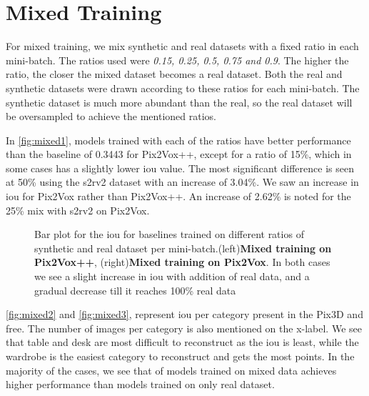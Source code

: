 \section{Mixed Training}\label{sec:mixed-training}
For mixed training, we mix synthetic and real datasets with a fixed ratio in each mini-batch.
The ratios used were \emph{0.15, 0.25, 0.5, 0.75 and 0.9}.
The higher the ratio, the closer the mixed dataset becomes a real dataset.
Both the real and synthetic datasets were drawn according to these ratios for each mini-batch.
The synthetic dataset is much more abundant than the real, so the real dataset will be oversampled to achieve the mentioned ratios.

In \autoref{fig:mixed1}, models trained with each of the ratios have better performance than the baseline of 0.3443 for Pix2Vox++,
except for a ratio of 15\%, which in some cases has a slightly lower \gls{iou}  value.
The most significant difference is seen at 50\% using the \gls{s2rv2} dataset with an increase of 3.04\%.
We saw an increase in \gls{iou} for Pix2Vox rather than Pix2Vox++.
An increase of 2.62\% is noted for the 25\% mix with \gls{s2rv2} on Pix2Vox.

\begin{figure}[ht]
    \centering
    \resizebox{0.49\linewidth}{0.45\linewidth}{}
    \resizebox{0.49\linewidth}{0.45\linewidth}{}
    \caption{Bar plot for the \gls{iou} for baselines trained on different ratios of synthetic and real dataset per mini-batch.(left)\textbf{Mixed training on Pix2Vox++}, (right)\textbf{Mixed training on Pix2Vox}.
    In both cases we see a slight increase in \gls{iou} with addition of real data, and a gradual decrease till it reaches 100\% real data}
    \label{fig:mixed1}
\end{figure}

\autoref{fig:mixed2} and \autoref{fig:mixed3}, represent \gls{iou} per category present in the Pix3D and \gls{free}.
The number of images per category is also mentioned on the x-label.
We see that table and desk are most difficult to reconstruct as the \gls{iou} is least, while the wardrobe is the easiest category to reconstruct and gets the most points.
In the majority of the cases, we see that  of models trained on mixed data achieves higher performance than models trained on only real dataset.


